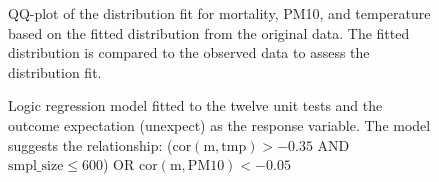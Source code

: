 \documentclass[
  12pt,
]{interact}
\begin{document}
\label{cell-fig-dist-fit}
\begin{figure}[H]


\caption{\label{fig-dist-fit}QQ-plot of the distribution fit for
mortality, PM10, and temperature based on the fitted distribution from
the original data. The fitted distribution is compared to the observed
data to assess the distribution fit.}

\end{figure}%

\begin{figure}


\caption{\label{fig-linear-reg-tree}Logic regression model fitted to the
twelve unit tests and the outcome expectation (unexpect) as the response
variable. The model suggests the relationship:
(\(\text{cor}(\text{m}, \text{tmp}) > -0.35\) AND
\(\text{smpl\_size} \le 600\)) OR
\(\text{cor}(\text{m},  \text{PM10}) < - 0.05\)}

\end{figure}%
\end{document}

